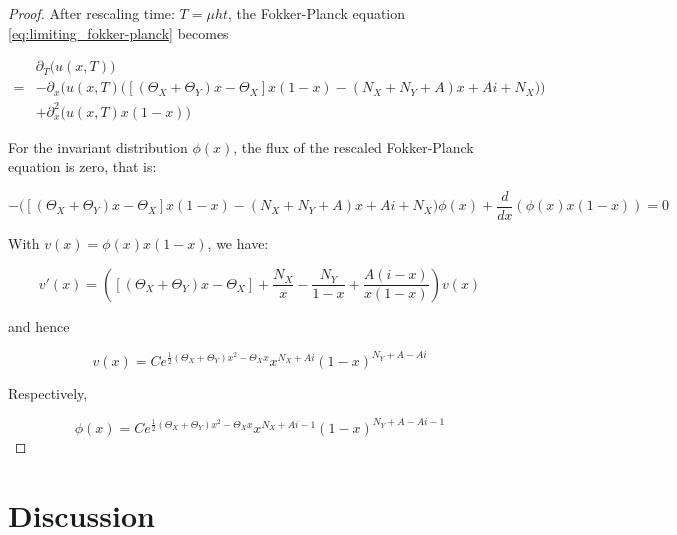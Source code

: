 \documentclass[12pt,a4paper,twoside]{article}
\begin{document}
\begin{proof}
	After rescaling time: $T = \mu h t$, the Fokker-Planck equation \eqref{eq:limiting_fokker-planck} becomes
	
	\begin{align*}
	&\partial_T \big(u\left(x, T\right)\big)\\
	=& -\partial_x\Bigg(u(x,T)\Big(\left[\left(\Theta_X + \Theta_Y\right)x - \Theta_X\right]x\left(1-x\right)-\left(N_X + N_Y + A\right)x+ Ai + N_X\Big)\Bigg)\\
		&+ \partial^2_x\big(u(x,T)x(1-x)\big)
	\end{align*}
	
	For the invariant distribution $\phi(x)$, the flux of the rescaled Fokker-Planck equation is zero, that is:
	
	\begin{equation*}
	-\Big(\left[\left(\Theta_X + \Theta_Y\right)x - \Theta_X\right]x\left(1-x\right)-\left(N_X + N_Y + A\right)x + Ai + N_X\Big)\phi(x) + \frac{d}{dx}\left(\phi(x)x\left(1-x\right)\right)= 0
	\end{equation*}
	
	With $v(x) = \phi(x)x\left(1-x\right)$, we have:
	
	\begin{equation*}
	v'(x) = \left(\left[\left(\Theta_X + \Theta_Y\right)x - \Theta_X\right] + \frac{N_X}{x} - \frac{N_Y}{1-x} + \frac{A(i-x)}{x(1-x)}\right)v(x)
	\end{equation*}
	
	and hence
	
	\begin{equation*}
	v(x) = Ce^{\frac{1}{2}\left(\Theta_X + \Theta_Y\right)x^2 - \Theta_X x}x^{N_X + Ai}\left(1-x\right)^{N_Y+A - Ai}
	\end{equation*}
	
	Respectively,
	
	\begin{equation*}
	\phi(x) = Ce^{\frac{1}{2}\left(\Theta_X + \Theta_Y\right)x^2 - \Theta_X x}x^{N_X + Ai - 1}\left(1-x\right)^{N_Y+A - Ai - 1}
	\end{equation*}
\end{proof}

\section{Discussion}
\end{document}
